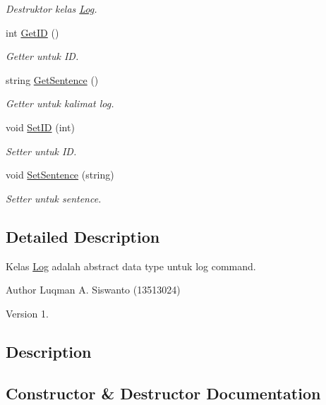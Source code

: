 \begin{DoxyCompactItemize}
\begin{DoxyCompactList}\small\item\em Destruktor kelas \hyperlink{class_log}{Log}. \end{DoxyCompactList}\item 
int \hyperlink{class_log_a14536320d9f23ef128cdb004a82d2b83}{Get\+I\+D} ()
\begin{DoxyCompactList}\small\item\em Getter untuk I\+D. \end{DoxyCompactList}\item 
string \hyperlink{class_log_af9f902b597baafe71409025441f0a3e0}{Get\+Sentence} ()
\begin{DoxyCompactList}\small\item\em Getter untuk kalimat log. \end{DoxyCompactList}\item 
void \hyperlink{class_log_a1461ddc76218e915e28d6448c35057ec}{Set\+I\+D} (int)
\begin{DoxyCompactList}\small\item\em Setter untuk I\+D. \end{DoxyCompactList}\item 
void \hyperlink{class_log_a312454df078b83a74e5559f2dd1d69ea}{Set\+Sentence} (string)
\begin{DoxyCompactList}\small\item\em Setter untuk sentence. \end{DoxyCompactList}\end{DoxyCompactItemize}


\subsection{Detailed Description}
Kelas \hyperlink{class_log}{Log} adalah abstract data type untuk log command. 

\begin{DoxyAuthor}{Author}
Luqman A. Siswanto (13513024) 
\end{DoxyAuthor}
\begin{DoxyVersion}{Version}
1.
\end{DoxyVersion}
\hypertarget{class_logger_Description}{}\subsection{Description}\label{class_logger_Description}


\subsection{Constructor \& Destructor Documentation}
\hypertarget{class_log_a0f45072d0b622c4d4f70bb0ef63bef42}{}
